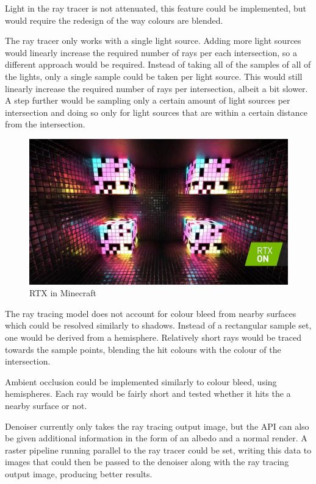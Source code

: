 \documentclass[times, utf8, zavrsni, numeric]{fer}
\begin{document}
Light in the ray tracer is not attenuated, this feature could be implemented, but would require the redesign of the way colours are blended.

The ray tracer only works with a single light source. Adding more light sources would linearly increase the required number of rays per each intersection, so a different approach would be required. Instead of taking all of the samples of all of the lights, only a single sample could be taken per light source. This would still linearly increase the required number of rays per intersection, albeit a bit slower. A step further would be sampling only a certain amount of light sources per intersection and doing so only for light sources that are within a certain distance from the intersection.

\begin{center}
\begin{figure}[H]
\includegraphics[width=1\textwidth]{rtx_on.jpg}
\caption{RTX in Minecraft \cite{minecraft_rtx}}
\end{figure}
\label{image:rtx_on}
\end{center}

The ray tracing model does not account for colour bleed from nearby surfaces which could be resolved similarly to shadows. Instead of a rectangular sample set, one would be derived from a hemisphere. Relatively short rays would be traced towards the sample points, blending the hit colours with the colour of the intersection.

Ambient occlusion could be implemented similarly to colour bleed, using hemispheres. Each ray would be fairly short and tested whether it hits the a nearby surface or not.

Denoiser currently only takes the ray tracing output image, but the API can also be given additional information in the form of an albedo and a normal render. A raster pipeline running parallel to the ray tracer could be set, writing this data to images that could then be passed to the denoiser along with the ray tracing output image, producing better results.
\end{document}
